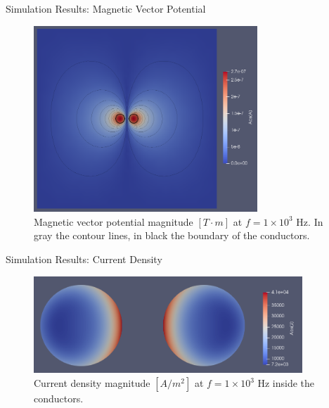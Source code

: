 \documentclass[aspectratio=54,xcolor=dvipsnames]{beamer}
\begin{document}
\begin{frame}{Simulation Results: Magnetic Vector Potential}
    \scriptsize
    \begin{figure}[H]
        \centering
        \includegraphics[width=0.75\textwidth]{Images/Abs_A_contour.png}
        \caption{Magnetic vector potential magnitude $[T \cdot m]$ at $f = 1 \times 10^3$ Hz. \newline In gray the contour lines, in black the boundary of the conductors.}
        \label{fig: A_1kHz}
    \end{figure}
\end{frame}

\begin{frame}{Simulation Results: Current Density}
    \scriptsize
    \begin{figure}[H]
        \centering
        \includegraphics[width=0.9\textwidth]{Images/Abs_J.png}
        \caption{Current density magnitude $[A/m^2]$ at $f = 1 \times 10^3$ Hz inside the conductors.}
        \label{fig: J_1kHz}
    \end{figure}
\end{frame}
\end{document}
